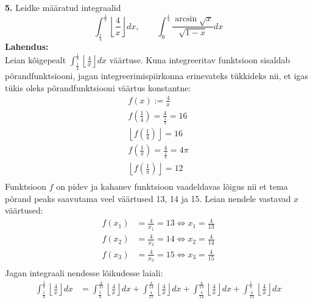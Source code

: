 \documentclass{article}
\begin{document}
\textbf{5.} Leidke m\"a\"aratud integraalid
\begin{equation*}
\int_{\frac{1}{4}}^{\frac{1}{\pi}}\left\lfloor{\frac{4}{x}}\right\rfloor dx,\qquad \int_0^{\frac{1}{4}}\frac{\arcsin\sqrt{x}}{\sqrt{1-x}}dx
\end{equation*}
\textbf{Lahendus:}\\
Leian k\~oigepealt $\int_{\frac{1}{4}}^{\frac{1}{\pi}}\left\lfloor{\frac{4}{x}}\right\rfloor dx$ v\"a\"artuse. Kuna integreeritav funktsioon sisaldab p\~orandfunktsiooni, jagan integreerimispiirkonna erinevateks t\"ukkideks nii, et igas t\"ukis oleks p\~orandfunktsiooni v\"a\"artus konstantne:
\begin{equation*}
\begin{aligned}
f(x):=\frac{4}{x}\\
f\left(\frac{1}{4}\right)=\frac{4}{\frac{1}{4}}=16\\
\left\lfloor f\left(\frac{1}{4}\right) \right\rfloor=16\\
f\left(\frac{1}{\pi}\right)=\frac{4}{\frac{1}{\pi}}=4\pi\\
\left\lfloor f\left(\frac{1}{\pi}\right) \right\rfloor=12\\
\end{aligned}
\end{equation*}
Funktsioon $f$ on pidev ja kahanev funktsioon vaadeldavas l\~oigus nii et tema p\~orand peaks saavutama veel v\"a\"artused 13, 14 ja 15. Leian nendele vastavad $x$ v\"a\"artused:
\begin{equation*}
\begin{aligned}
f(x_1)&=\frac{4}{x_1}=13\Leftrightarrow x_1=\frac{4}{13}\\
f(x_2)&=\frac{4}{x_2}=14\Leftrightarrow x_2=\frac{4}{14}\\
f(x_3)&=\frac{4}{x_3}=15\Leftrightarrow x_3=\frac{4}{15}\\
\end{aligned}
\end{equation*}
Jagan integraali nendesse l\~oikudesse laiali:
\begin{equation*}
\begin{aligned}
\int_{\frac{1}{4}}^{\frac{1}{\pi}}\left\lfloor{\frac{4}{x}}\right\rfloor dx&=\int_{\frac{1}{4}}^{\frac{4}{15}}\left\lfloor{\frac{4}{x}}\right\rfloor dx+\int_{\frac{4}{15}}^{\frac{4}{14}}\left\lfloor{\frac{4}{x}}\right\rfloor dx+\int_{\frac{4}{14}}^{\frac{4}{13}}\left\lfloor{\frac{4}{x}}\right\rfloor dx+\int_{\frac{4}{13}}^{\frac{1}{\pi}}\left\lfloor{\frac{4}{x}}\right\rfloor dx
\end{aligned}
\end{equation*}
\end{document}
